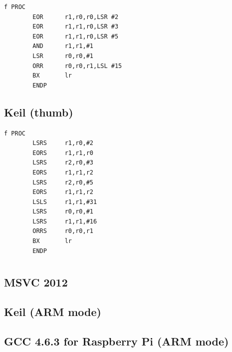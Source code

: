 \begin{lstlisting}
f PROC
        EOR      r1,r0,r0,LSR #2
        EOR      r1,r1,r0,LSR #3
        EOR      r1,r1,r0,LSR #5
        AND      r1,r1,#1
        LSR      r0,r0,#1
        ORR      r0,r0,r1,LSL #15
        BX       lr
        ENDP
\end{lstlisting}

\subsection{Keil (thumb)}

\begin{lstlisting}
f PROC
        LSRS     r1,r0,#2
        EORS     r1,r1,r0
        LSRS     r2,r0,#3
        EORS     r1,r1,r2
        LSRS     r2,r0,#5
        EORS     r1,r1,r2
        LSLS     r1,r1,#31
        LSRS     r0,r0,#1
        LSRS     r1,r1,#16
        ORRS     r0,r0,r1
        BX       lr
        ENDP
\end{lstlisting}

\section{}


\subsection{MSVC 2012}



\subsection{Keil (ARM mode)}



\subsection{GCC 4.6.3 for Raspberry Pi (ARM mode)}



\section{}

